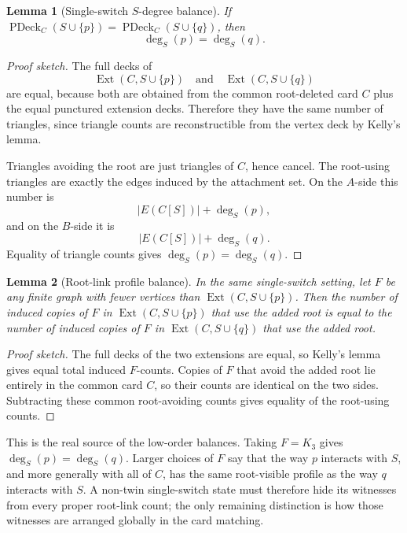 \documentclass[11pt]{article}
\newtheorem{lemma}{Lemma}
\newcommand{\PDeck}{\operatorname{PDeck}}
\newcommand{\Ext}{\operatorname{Ext}}
\begin{document}
\begin{lemma}[Single-switch \(S\)-degree balance]
If \(\PDeck_C(S\cup\{p\})=\PDeck_C(S\cup\{q\})\), then
\[
  \deg_S(p)=\deg_S(q).
\]
\end{lemma}

\begin{proof}[Proof sketch]
The full decks of
\[
  \Ext(C,S\cup\{p\})
  \quad\text{and}\quad
  \Ext(C,S\cup\{q\})
\]
are equal, because both are obtained from the common root-deleted card \(C\)
plus the equal punctured extension decks.  Therefore they have the same
number of triangles, since triangle counts are reconstructible from the
vertex deck by Kelly's lemma.

Triangles avoiding the root are just triangles of \(C\), hence cancel.  The
root-using triangles are exactly the edges induced by the attachment set.  On
the \(A\)-side this number is
\[
  |E(C[S])|+\deg_S(p),
\]
and on the \(B\)-side it is
\[
  |E(C[S])|+\deg_S(q).
\]
Equality of triangle counts gives \(\deg_S(p)=\deg_S(q)\).
\end{proof}

\begin{lemma}[Root-link profile balance]
In the same single-switch setting, let \(F\) be any finite graph with fewer
vertices than \(\Ext(C,S\cup\{p\})\).  Then the number of induced copies of
\(F\) in \(\Ext(C,S\cup\{p\})\) that use the added root is equal to the
number of induced copies of \(F\) in \(\Ext(C,S\cup\{q\})\) that use the
added root.
\end{lemma}

\begin{proof}[Proof sketch]
The full decks of the two extensions are equal, so Kelly's lemma gives equal
total induced \(F\)-counts.  Copies of \(F\) that avoid the added root lie
entirely in the common card \(C\), so their counts are identical on the two
sides.  Subtracting these common root-avoiding counts gives equality of the
root-using counts.
\end{proof}

This is the real source of the low-order balances.  Taking \(F=K_3\) gives
\(\deg_S(p)=\deg_S(q)\).  Larger choices of \(F\) say that the way \(p\)
interacts with \(S\), and more generally with all of \(C\), has the same
root-visible profile as the way \(q\) interacts with \(S\).  A non-twin
single-switch state must therefore hide its witnesses from every proper
root-link count; the only remaining distinction is how those witnesses are
arranged globally in the card matching.
\end{document}
